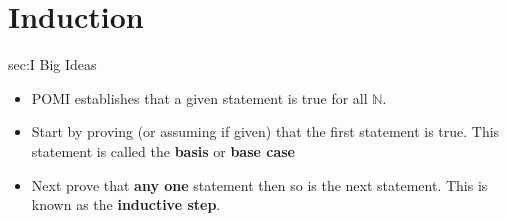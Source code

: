 \chapter{Induction}
\label{chap:I}

\begin{bigideas}{sec:I Big Ideas}
\begin{itemize}
  \item POMI establishes that a given statement is true for all $\mathbb{N}$.
  \item Start by proving (or assuming if given) that the first statement is true. This statement is called the \textbf{basis} or \textbf{base case}
  \item Next prove that \textbf{any one} statement then so is the next statement. This is known as the \textbf{inductive step}.
\end{itemize}
\end{bigideas}